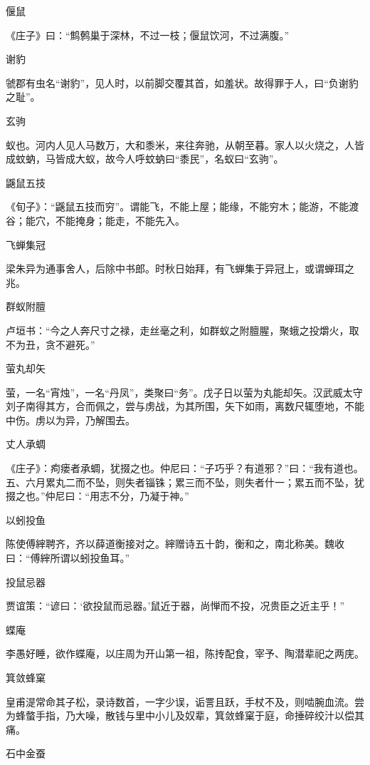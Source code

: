 \documentclass[a4paper,12pt,UTF8,twoside]{ctexbook}
\begin{document}
    偃鼠
    
    《庄子》曰：“鹪鹩巢于深林，不过一枝；偃鼠饮河，不过满腹。”
    
    谢豹
    
    虢郡有虫名“谢豹”，见人时，以前脚交覆其首，如羞状。故得罪于人，曰“负谢豹之耻”。
    
    玄驹
    
    蚁也。河内人见人马数万，大和黍米，来往奔驰，从朝至暮。家人以火烧之，人皆成蚊蚋，马皆成大蚁，故今人呼蚊蚋曰“黍民”，名蚁曰“玄驹”。
    
    鼷鼠五技
    
    《旬子》：“鼷鼠五技而穷”。谓能飞，不能上屋；能缘，不能穷木；能游，不能渡谷；能穴，不能掩身；能走，不能先入。
    
    飞蝉集冠
    
    梁朱异为通事舍人，后除中书郎。时秋日始拜，有飞蝉集于异冠上，或谓蝉珥之兆。
    
    群蚁附膻
    
    卢垣书：“今之人奔尺寸之禄，走丝毫之利，如群蚁之附膻腥，聚蛾之投爝火，取不为丑，贪不避死。”
    
    萤丸却矢
    
    萤，一名“宵烛”，一名“丹凤”，类聚曰“务”。戊子日以萤为丸能却矢。汉武威太守刘子南得其方，合而佩之，尝与虏战，为其所围，矢下如雨，离数尺辄堕地，不能中伤。虏以为异，乃解围去。
    
    丈人承蜩
    
    《庄子》：痀瘘者承蜩，犹掇之也。仲尼曰：“子巧乎？有道邪？”曰：“我有道也。五、六月累丸二而不坠，则失者锱铢；累三而不坠，则失者什一；累五而不坠，犹掇之也。”仲尼曰：“用志不分，乃凝于神。”
    
    以蚓投鱼
    
    陈使傅縡聘齐，齐以薛道衡接对之。縡赠诗五十韵，衡和之，南北称美。魏收曰：“傅縡所谓以蚓投鱼耳。”
    
    投鼠忌器
    
    贾谊策：“谚曰：‘欲投鼠而忌器。’鼠近于器，尚惮而不投，况贵臣之近主乎！”
    
    蝶庵
    
    李愚好睡，欲作蝶庵，以庄周为开山第一祖，陈抟配食，宰予、陶潜辈祀之两庑。
    
    箕敛蜂窠
    
    皇甫湜常命其子松，录诗数首，一字少误，诟詈且跃，手杖不及，则啮腕血流。尝为蜂螫手指，乃大噪，散钱与里中小儿及奴辈，箕敛蜂窠于庭，命捶碎绞汁以偿其痛。
    
    石中金蚕
    
\end{document}

